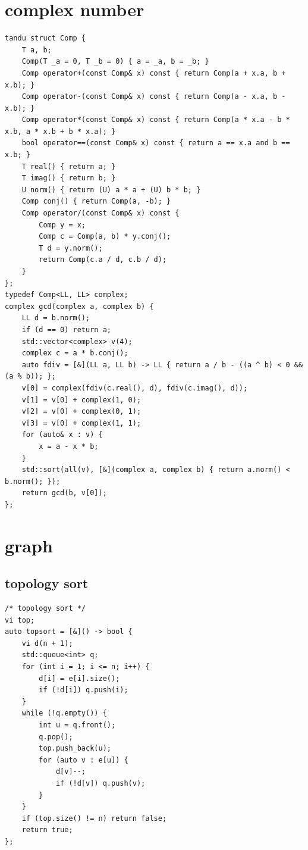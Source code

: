 \documentclass[UTF8, a4paper, titlepage, twoside]{ctexart}
\begin{document}
\section{ complex number }
\begin{lstlisting}[style=cpp]
tandu struct Comp {
    T a, b;
    Comp(T _a = 0, T _b = 0) { a = _a, b = _b; }
    Comp operator+(const Comp& x) const { return Comp(a + x.a, b + x.b); }
    Comp operator-(const Comp& x) const { return Comp(a - x.a, b - x.b); }
    Comp operator*(const Comp& x) const { return Comp(a * x.a - b * x.b, a * x.b + b * x.a); }
    bool operator==(const Comp& x) const { return a == x.a and b == x.b; }
    T real() { return a; }
    T imag() { return b; }
    U norm() { return (U) a * a + (U) b * b; }
    Comp conj() { return Comp(a, -b); }
    Comp operator/(const Comp& x) const {
        Comp y = x;
        Comp c = Comp(a, b) * y.conj();
        T d = y.norm();
        return Comp(c.a / d, c.b / d);
    }
};
typedef Comp<LL, LL> complex;
complex gcd(complex a, complex b) {
    LL d = b.norm();
    if (d == 0) return a;
    std::vector<complex> v(4);
    complex c = a * b.conj();
    auto fdiv = [&](LL a, LL b) -> LL { return a / b - ((a ^ b) < 0 && (a % b)); };
    v[0] = complex(fdiv(c.real(), d), fdiv(c.imag(), d));
    v[1] = v[0] + complex(1, 0);
    v[2] = v[0] + complex(0, 1);
    v[3] = v[0] + complex(1, 1);
    for (auto& x : v) {
        x = a - x * b;
    }
    std::sort(all(v), [&](complex a, complex b) { return a.norm() < b.norm(); });
    return gcd(b, v[0]);
};
\end{lstlisting}

\newpage
\section{ graph }
\subsection{ topology sort }
\begin{lstlisting}[style=cpp]
/* topology sort */
vi top;
auto topsort = [&]() -> bool {
    vi d(n + 1);
    std::queue<int> q;
    for (int i = 1; i <= n; i++) {
        d[i] = e[i].size();
        if (!d[i]) q.push(i);
    }
    while (!q.empty()) {
        int u = q.front();
        q.pop();
        top.push_back(u);
        for (auto v : e[u]) {
            d[v]--;
            if (!d[v]) q.push(v);
        }
    }
    if (top.size() != n) return false;
    return true;
};
\end{lstlisting}
\end{document}
